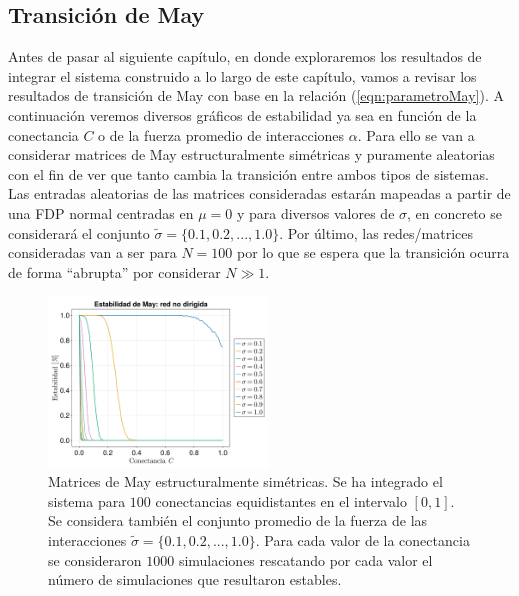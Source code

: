 \subsection{Transición de May}

Antes de pasar al siguiente capítulo, en donde exploraremos los resultados de integrar el sistema construido a lo largo de este capítulo, vamos a revisar los resultados de transición de May con base en la relación (\ref{eqn:parametroMay}). A continuación veremos diversos gráficos de estabilidad ya sea en función de la conectancia $C$ o de la fuerza promedio de interacciones $\alpha$. Para ello se van a considerar matrices de May estructuralmente simétricas y puramente aleatorias con el fin de ver que tanto cambia la transición entre ambos tipos de sistemas. Las entradas aleatorias de las matrices consideradas estarán mapeadas a partir de una FDP normal centradas en $\mu=0$ y para diversos valores de $\sigma$, en concreto se considerará el conjunto $\tilde{\sigma}=\{0.1,0.2,...,1.0\}$. Por último, las redes/matrices consideradas van a ser para $N=100$ por lo que se espera que la transición ocurra de forma ``abrupta'' por considerar $N\gg 1$. 
\begin{figure} \vspace{-30pt} \begin{center}
		\includegraphics[width=0.52\textwidth]{../Imagenes/TransicionMayNoDirLin} 
	\end{center} 
	\vspace{-20pt} 
	\caption{Matrices de May estructuralmente simétricas. Se ha integrado el sistema para $100$ conectancias equidistantes en el intervalo $[0,1]$. Se considera también el conjunto promedio de la fuerza de las interacciones $\tilde{\sigma}=\{0.1,0.2,...,1.0\}$. Para cada valor de la conectancia se consideraron $1000$ simulaciones rescatando por cada valor el número de simulaciones que resultaron estables.} 
	\vspace{-10pt}
	\label{fig:TransicionMayNoDirLin}
\end{figure} 
